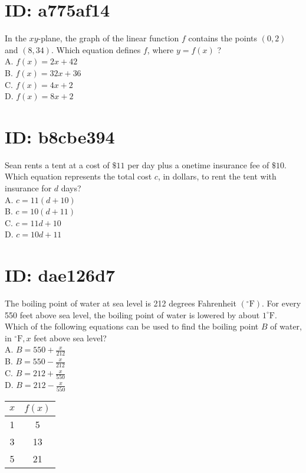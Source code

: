 \section*{ID: a775af14}
In the $x y$-plane, the graph of the linear function $f$ contains the points $(0,2)$ and $(8,34)$. Which equation defines $f$, where $y=f(x)$ ?\\
A. $f(x)=2 x+42$\\
B. $f(x)=32 x+36$\\
C. $f(x)=4 x+2$\\
D. $f(x)=8 x+2$

\section*{ID: b8cbe394}
Sean rents a tent at a cost of $\$ 11$ per day plus a onetime insurance fee of $\$ 10$. Which equation represents the total cost $c$, in dollars, to rent the tent with insurance for $d$ days?\\
A. $c=11(d+10)$\\
B. $c=10(d+11)$\\
C. $c=11 d+10$\\
D. $c=10 d+11$

\section*{ID: dae126d7}
The boiling point of water at sea level is 212 degrees Fahrenheit $\left({ }^{\circ} \mathrm{F}\right)$. For every 550 feet above sea level, the boiling point of water is lowered by about $1^{\circ} \mathrm{F}$. Which of the following equations can be used to find the boiling point $B$ of water, in ${ }^{\circ} \mathrm{F}, x$ feet above sea level?\\
A. $B=550+\frac{x}{212}$\\
B. $B=550-\frac{x}{212}$\\
C. $B=212+\frac{x}{550}$\\
D. $B=212-\frac{x}{550}$

\begin{center}
\begin{tabular}{|c|c|}
\hline
$x$ & $f(x)$ \\
\hline
1 & 5 \\
\hline
3 & 13 \\
\hline
5 & 21 \\
\hline
\end{tabular}
\end{center}

